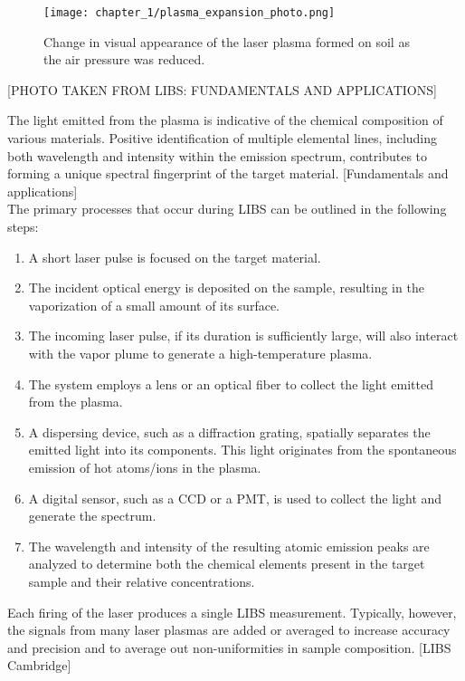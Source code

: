 \begin{figure}[H]
    \centering
    \texttt{[image: chapter\_1/plasma\_expansion\_photo.png]}
    \label{fig:plasma_expansion}
    \\[20pt]
    \caption[Photo of a plasma expanding.]{Change in visual appearance of the laser plasma formed on soil as the air pressure was reduced.}
\end{figure}
[PHOTO TAKEN FROM LIBS: FUNDAMENTALS AND APPLICATIONS]

The light emitted from the plasma is indicative of the chemical composition of various materials. Positive identification of multiple elemental lines, including both wavelength and intensity within the emission spectrum, contributes to forming a unique spectral fingerprint of the target material. [Fundamentals and applications]
\\
The primary processes that occur during LIBS can be outlined in the following steps:

\begin{enumerate}
\item A short laser pulse is focused on the target material.
\item The incident optical energy is deposited on the sample, resulting in the vaporization of a small amount of its surface.
\item The incoming laser pulse, if its duration is sufficiently large, will also interact with the vapor plume to generate a high-temperature plasma.
\item The system employs a lens or an optical fiber to collect the light emitted from the plasma.
\item A dispersing device, such as a diffraction grating, spatially separates the emitted light into its components. This light originates from the spontaneous emission of hot atoms/ions in the plasma.
\item A digital sensor, such as a CCD or a PMT, is used to collect the light and generate the spectrum.
\item The wavelength and intensity of the resulting atomic emission peaks are analyzed to determine both the chemical elements present in the target sample and their relative concentrations.
\end{enumerate}
Each firing of the laser produces a single LIBS measurement. Typically, however, the signals from many laser plasmas are added or averaged to increase accuracy and precision and to average out non-uniformities in sample composition. [LIBS Cambridge]

